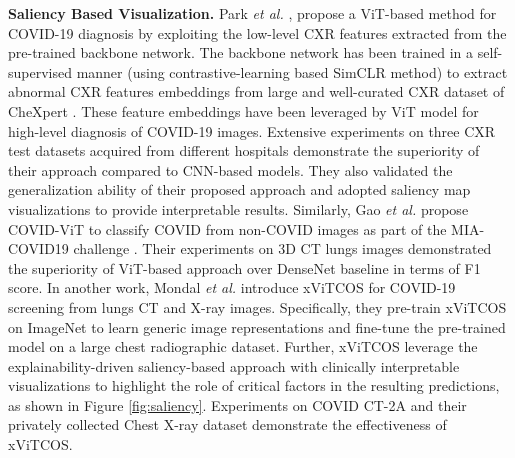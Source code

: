 \documentclass[10pt,journal,compsoc]{IEEEtran}
\begin{document}
 {{\textbf{Saliency Based Visualization.}}} Park \textit{et al.} \cite{park2021vision}, propose a ViT-based method for COVID-19 diagnosis by exploiting the low-level CXR features extracted from the pre-trained backbone network. The backbone network has been trained in a self-supervised manner (using contrastive-learning based SimCLR \cite{chen2020simple} method) to extract abnormal CXR features embeddings from large and well-curated CXR dataset of CheXpert \cite{irvin2019chexpert}. These feature embeddings have been leveraged by ViT model for high-level diagnosis of COVID-19 images. Extensive experiments on three CXR test datasets acquired from  different hospitals demonstrate the superiority of their approach compared to CNN-based models. They also validated the generalization ability of their proposed approach and adopted saliency map visualizations \cite{chefer2021transformer} to provide interpretable results.
Similarly, Gao \textit{et al.} \cite{gao2021covid} propose COVID-ViT  to classify COVID from non-COVID images as part of the MIA-COVID19 challenge \cite{kollias2021mia}. Their experiments on 3D CT lungs images demonstrated the superiority of ViT-based approach over DenseNet \cite{huang2017densely} baseline in terms of F1 score.
In another work, Mondal \textit{et al.} \cite{mondal2021xvitcos} introduce xViTCOS for COVID-19 screening from lungs CT and X-ray images. Specifically, they pre-train xViTCOS on ImageNet to learn generic image representations and fine-tune the pre-trained model on a large chest radiographic dataset. Further, xViTCOS leverage the explainability-driven saliency-based approach \cite{chefer2021transformer} with clinically interpretable visualizations to highlight the role of critical factors in the resulting predictions, as shown in Figure \ref{fig:saliency}. Experiments on COVID CT-2A \cite{gunraj2021covid} and their privately collected Chest X-ray dataset demonstrate the effectiveness of xViTCOS.%
\end{document}
